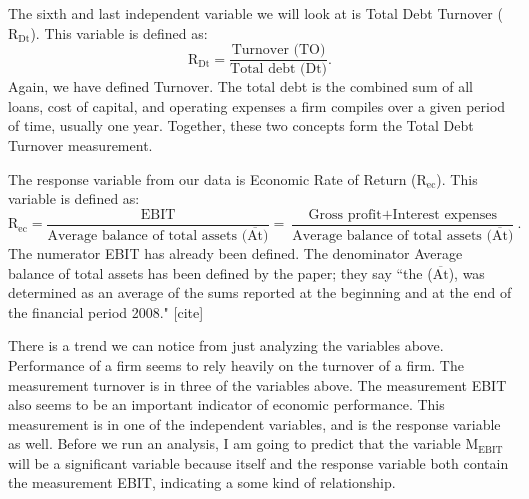 \documentclass[12pt,letterpaper]{article}
\begin{document}
\setlength\parindent{24pt} The sixth and last independent variable we will look at is Total Debt Turnover ($\text{R}_{\text{Dt}}$). This variable is defined as: $$\text{R}_{\text{Dt}}=\frac{\text{Turnover (TO)}}{\text{Total debt (Dt)}}.$$ Again, we have defined Turnover. The total debt is the combined sum of all loans, cost of capital, and operating expenses a firm compiles over a given period of time, usually one year. Together, these two concepts form the Total Debt Turnover measurement.

\setlength\parindent{24pt} The response variable from our data is Economic Rate of Return ($\text{R}_{\text{ec}}$). This variable is defined as: $$\text{R}_{\text{ec}}=\frac{\text{EBIT}}{\text{Average balance of total assets ($\overline{\text{At}}$)}}=\frac{\text{Gross profit}+\text{Interest expenses}}{\text{Average balance of total assets ($\overline{\text{At}}$)}}.$$ The numerator EBIT has already been defined. The denominator Average balance of total assets has been defined by the paper; they say ``the ($\overline{\text{At}}$), was determined as an average of the sums reported at the beginning and at the end of the financial period 2008." [cite]

\setlength\parindent{24pt} There is a trend we can notice from just analyzing the variables above. Performance of a firm seems to rely heavily on the turnover of a firm. The measurement turnover is in three of the variables above. The measurement EBIT also seems to be an important indicator of economic performance. This measurement is in one of the independent variables, and is the response variable as well. Before we run an analysis, I am going to predict that the variable $\text{M}_{\text{EBIT}}$ will be a significant variable because itself and the response variable both contain the measurement EBIT, indicating a some kind of relationship.
\end{document}
